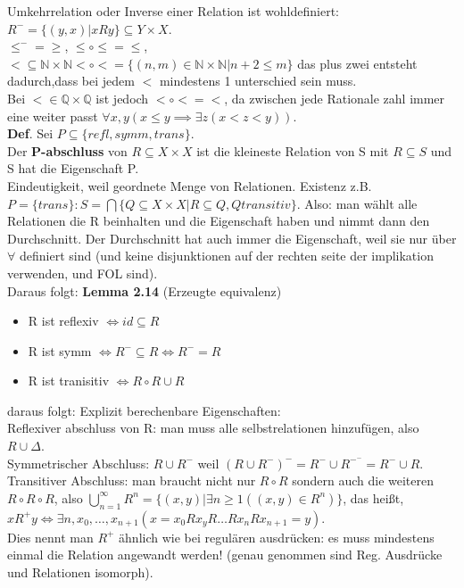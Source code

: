 \documentclass{article}
\begin{document}
	Umkehrrelation oder Inverse einer Relation ist wohldefiniert:\\
	$R^- =\{(y,x) | xRy\}\subseteq Y\times X$.\\
	$\leq^-=\geq$, $\leq\circ \leq = \leq $,\\
	$< \subseteq \mathbb{N}\times\mathbb{N}< \circ < = \{(n,m)\in\mathbb{N}\times\mathbb{N}|n+2\leq m\}$  das plus zwei entsteht dadurch,dass bei jedem $<$ mindestens 1 unterschied sein muss.\\
	Bei $<\in\mathbb{Q}\times\mathbb{Q}$ ist jedoch $<\circ < = <$, da zwischen jede Rationale zahl immer eine weiter passt $\forall x,y( x\leq y \implies \exists z(x<z<y))$.\\
	\textbf{Def}. Sei $P\subseteq\{refl, symm, trans\}$.\\
	Der \textbf{P-abschluss} von $R\subseteq X\times X$ ist die kleineste Relation von S mit $R\subseteq S$ und S hat die Eigenschaft P.\\
	Eindeutigkeit, weil geordnete Menge von Relationen.	Existenz z.B. $P=\{trans\}: S= \bigcap \{Q\subseteq X\times X | R\subseteq Q, Q transitiv\}$. Also: man wählt alle Relationen die R beinhalten und die Eigenschaft haben und nimmt dann den Durchschnitt. Der Durchschnitt hat auch immer die Eigenschaft, weil sie nur über $\forall$ definiert sind (und keine disjunktionen auf der rechten seite der implikation verwenden, und FOL sind).\\
	Daraus folgt:
	\textbf{Lemma 2.14 }(Erzeugte equivalenz)
	\begin{itemize}
		\item R ist reflexiv $\iff id\subseteq R$
		\item R ist symm $\iff R^-\subseteq R \iff R^-=R$
		\item R ist tranisitiv $\iff R\circ R\cup R$
	\end{itemize}
	daraus folgt:
	Explizit berechenbare Eigenschaften:\\
	Reflexiver abschluss von R: man muss alle selbstrelationen hinzufügen, also $R\cup \Delta$.\\
	Symmetrischer Abschluss: $R\cup R^-$ weil $(R\cup R^-)^- = R^-\cup R^{-^-} = R^-\cup R$.\\
	Transitiver Abschluss: man braucht nicht nur $R\circ R$ sondern auch die weiteren $R\circ R\circ R$, also $\bigcup\limits^\infty_{n=1} R^n = \{(x,y)| \exists n\geq 1 ((x,y)\in R^n)\}$,
	das heißt, $xR^+y\iff \exists n,x_0,\dots, x_{n+1}(x=x_0Rx_yR\dots Rx_nRx_{n+1}=y)$.\\
	Dies nennt man $R^+$ ähnlich wie bei regulären ausdrücken: es muss mindestens einmal die Relation angewandt werden! (genau genommen sind Reg. Ausdrücke und Relationen isomorph).
\end{document}
